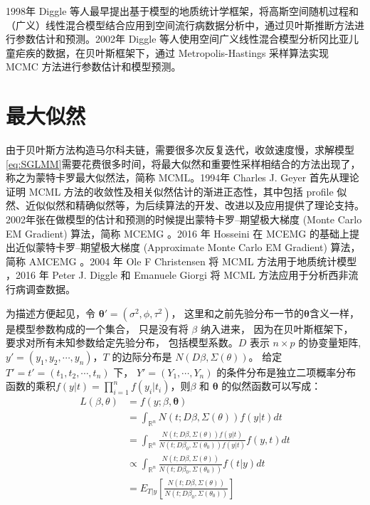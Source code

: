\documentclass[hyperref, a4paper, UTF8, zihao = -4, linespread = 1.25, scheme = chinese]{ctexbook}
\begin{document}
1998年 Diggle
等人最早提出基于模型的地质统计学框架，将高斯空间随机过程和（广义）线性混合模型结合应用到空间流行病数据分析中，通过贝叶斯推断方法进行参数估计和预测\citep{Diggle1998}。2002年
Diggle
等人使用空间广义线性混合模型分析冈比亚儿童疟疾的数据，在贝叶斯框架下，通过
Metropolis-Hastings 采样算法实现 MCMC
方法进行参数估计和模型预测\citep{Diggle2002}。

\hypertarget{likelihood}{%
\section{最大似然}\label{likelihood}}

由于贝叶斯方法构造马尔科夫链，需要很多次反复迭代，收敛速度慢，求解模型\eqref{eq:SGLMM}需要花费很多时间，将最大似然和重要性采样相结合的方法出现了，称之为蒙特卡罗最大似然法，简称
MCML。1994年 Charles J. Geyer 首先从理论证明 MCML
方法的收敛性及相关似然估计的渐进正态性，其中包括 profile
似然、近似似然和精确似然等，为后续算法的开发、改进以及应用提供了理论支持\citep{Geyer1994On}。2002年张在做模型的估计和预测的时候提出蒙特卡罗--期望极大梯度
(Monte Carlo EM Gradient) 算法，简称 MCEMG \citep{Zhang2002On}。2016 年
Hosseini 在 MCEMG 的基础上提出近似蒙特卡罗--期望极大梯度 (Approximate
Monte Carlo EM Gradient) 算法，简称 AMCEMG \citep{Hosseini2016}。2004 年
Ole F Christensen 将 MCML 方法用于地质统计模型
\citep{Christensen2004}，2016 年 Peter J. Diggle 和 Emanuele Giorgi 将
MCML 方法应用于分析西非流行病调查数据。

为描述方便起见，令 \(\bm{\theta}' = (\sigma^2,\phi,\tau^2)\)，
这里和之前先验分布一节的\(\bm{\theta}\)含义一样，
是模型参数构成的一个集合， 只是没有将 \(\beta\) 纳入进来，
因为在贝叶斯框架下， 要求对所有未知参数给定先验分布，
包括模型系数。\(D\) 表示 \(n\times p\) 的协变量矩阵,
\(y' = (y_1,y_2,\cdots,y_n)\)，\(T\) 的边际分布是
\(N(D\beta,\Sigma(\theta))\)。 给定 \(T'=t'=(t_1,t_2,\cdots,t_n)\) 下，
\(Y'=(Y_1,\cdots,Y_n)\)
的条件分布是独立二项概率分布函数的乘积\(f(y|t)=\prod_{i=1}^{n}f(y_{i}|t_{i})\)，则\(\beta\)
和 \(\bm{\theta}\) 的似然函数可以写成：\begin{equation}
\begin{aligned}
L(\beta,\theta)
& = f(y;\beta,\bm{\theta}) \\
& = \int_{\mathbb{R}^{n}} N(t;D\beta,\Sigma(\theta))f(y|t)dt\\
& = \int_{\mathbb{R}^{n}} \frac{N(t;D\beta,\Sigma(\theta))f(y|t)}{N(t;D\beta_{0},\Sigma(\theta_{0}))f(y|t)}f(y,t)dt\\
& \varpropto \int_{\mathbb{R}^{n}} \frac{N(t;D\beta,\Sigma(\theta))}{N(t;D\beta_{0},\Sigma(\theta_{0}))}f(t|y)dt \\
&= E_{T|y}\left[\frac{N(t;D\beta,\Sigma(\theta))}{N(t;D\beta_{0},\Sigma(\theta_{0}))}\right] \label{eq:likelihood2}
\end{aligned}
\end{equation}
\end{document}
